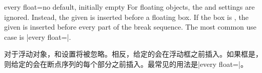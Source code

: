 \begin{docTcbKey}[][doc new=2014-09-19]{every float}{=}{no default, initially empty}
For floating objects, the  and 
settings are ignored. Instead, the given  is inserted before
a floating box. If the box is , the given  is
inserted before every part of the break sequence.
The most common use case is |every float=\centering|.

对于浮动对象，和设置将被忽略。相反，给定的会在浮动框之前插入。如果框是，则给定的会在断点序列的每个部分之前插入。最常见的用法是|every float=\centering|。


\begin{dispListing}
\end{dispListing}
{\tcbusetemp}

\end{docTcbKey}